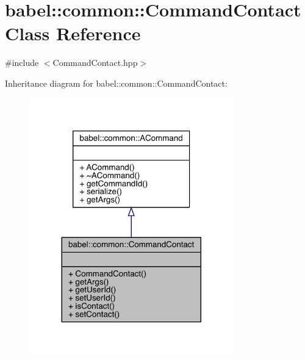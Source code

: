 \hypertarget{classbabel_1_1common_1_1_command_contact}{}\section{babel\+:\+:common\+:\+:Command\+Contact Class Reference}
\label{classbabel_1_1common_1_1_command_contact}


{\ttfamily \#include $<$Command\+Contact.\+hpp$>$}



Inheritance diagram for babel\+:\+:common\+:\+:Command\+Contact\+:\nopagebreak
\begin{figure}[H]
\begin{center}
\leavevmode
\includegraphics[width=251pt]{classbabel_1_1common_1_1_command_contact__inherit__graph}
\end{center}
\end{figure}


